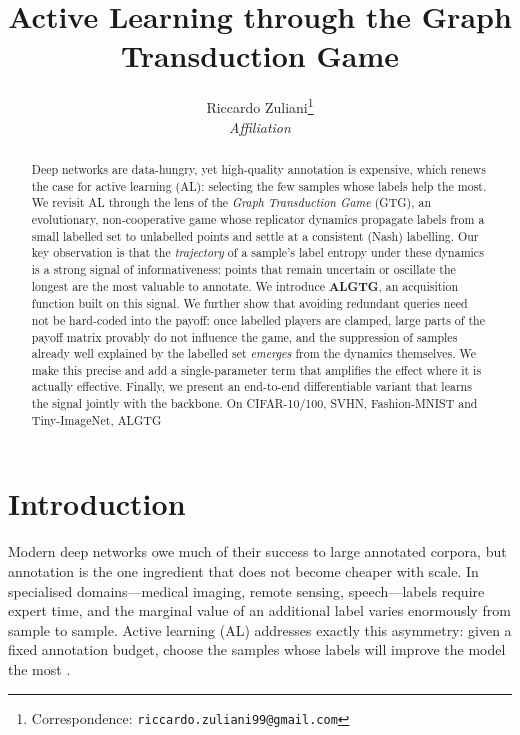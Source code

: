 \documentclass[11pt]{article}
\title{\textbf{Active Learning through the Graph Transduction Game}}
\author{
  Riccardo Zuliani\thanks{Correspondence: \texttt{riccardo.zuliani99@gmail.com}} \\
  \textit{Affiliation}
}
\date{}
\begin{document}
\maketitle

\begin{abstract}
Deep networks are data-hungry, yet high-quality annotation is expensive, which
renews the case for active learning (AL): selecting the few samples whose labels
help the most. We revisit AL through the lens of the \emph{Graph Transduction Game}
(GTG), an evolutionary, non-cooperative game whose replicator dynamics propagate
labels from a small labelled set to unlabelled points and settle at a consistent
(Nash) labelling. Our key observation is that the \emph{trajectory} of a sample's
label entropy under these dynamics is a strong signal of informativeness: points
that remain uncertain or oscillate the longest are the most valuable to annotate.
We introduce \textbf{ALGTG}, an acquisition function built on this signal. We further
show that avoiding redundant queries need not be hard-coded into the payoff: once
labelled players are clamped, large parts of the payoff matrix provably do not
influence the game, and the suppression of samples already well explained by the
labelled set \emph{emerges} from the dynamics themselves. We make this precise and
add a single-parameter term that amplifies the effect where it is actually
effective. Finally, we present an end-to-end differentiable variant that learns the
signal jointly with the backbone. On CIFAR-10/100, SVHN, Fashion-MNIST and
Tiny-ImageNet, ALGTG %
\end{abstract}

\section{Introduction}

Modern deep networks owe much of their success to large annotated corpora, but
annotation is the one ingredient that does not become cheaper with scale. In
specialised domains---medical imaging, remote sensing, speech---labels require
expert time, and the marginal value of an additional label varies enormously from
sample to sample. Active learning (AL) addresses exactly this asymmetry: given a
fixed annotation budget, choose the samples whose labels will improve the model the
most \citep{settles2009active}.
\end{document}

